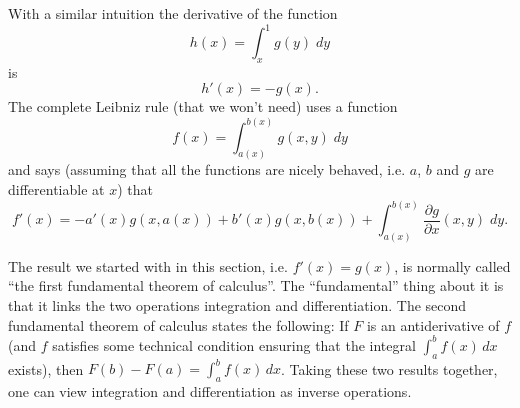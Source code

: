 \documentclass[a4paper,12pt]{article}
\begin{document}
With a similar intuition the derivative of the function 
\begin{equation*}
  h(x)=\int_x^1g(y)\; dy
\end{equation*}
is 
\begin{equation*}
  h'(x)=-g(x).
\end{equation*}
The complete Leibniz rule (that we won't need) uses a function
\begin{equation*}
  f(x)=\int_{a(x)}^{b(x)}g(x,y)\;dy
\end{equation*}
and says (assuming that all the functions are nicely behaved, i.e. $a$, $b$ and $g$ are differentiable at $x$) that 
\begin{equation*}
  f'(x)=-a'(x) g(x,a(x))+b'(x)g(x,b(x))+\int_{a(x)}^{b(x)}\frac{\partial g}{\partial x}(x,y)\;dy.
\end{equation*}

The result we started with in this section, i.e. $f'(x)=g(x)$, is normally called ``the first fundamental theorem of calculus''. The ``fundamental'' thing about it is that it links the two operations integration and differentiation. The second fundamental theorem of calculus states the following: If $F$ is an antiderivative of $f$ (and $f$ satisfies some technical condition ensuring that the integral $\int_a^b f(x)\,dx$ exists), then $F(b)-F(a)=\int_a^b f(x)\,dx$. Taking these two results together, one can view integration and differentiation as inverse operations. 
\end{document}
